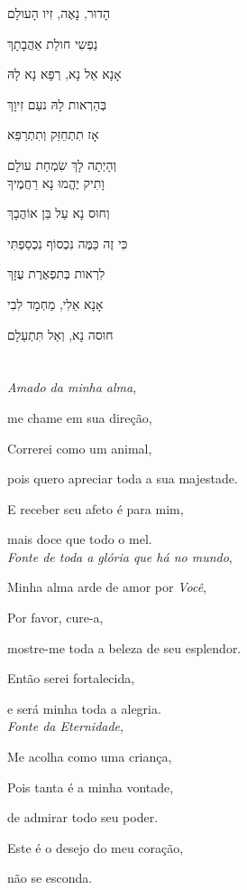הָדוּר, נָאֶה, זִיו הָעולָם

נַפְשִי חולַת אַהֲבָתָךְ

אָנָא אֵל נָא, רְפָא נָא לָהּ

בְּהַרְאות לָהּ נעַם זִיוָךְ

אָז תִתְחֵזֵּק וְתִתְרַפֵּא

וְהָיְתָה לָךְ שִׂמְחַת עולָם\\[10pt]

וָתִיק יֶהֱמוּ נָא רַחֲמֶיךָ

וְחוּס נָא עַל בֵּן אוֹהֲבָךְ

כִּי זֶה כַּמֶּה נִכְסוֹף נִכְסַפְתִּי

לִרְאות בְּתִפְאֶרֶת עֻזָךְ

אָנָא אֵלִי, מַחְמָד לִבִי

חוּסה נָא, וְאַל תִּתְעַלָם


\movetooddpage
\raggedright

\section{}

\emph{Amado da minha alma},

me chame em sua direção,

Correrei como um animal,

pois quero apreciar toda a sua majestade.

E receber seu afeto é para mim,

mais doce que todo o mel.\\[10pt]

\emph{Fonte de toda a glória que há no mundo},

Minha alma arde de amor por \emph{Você},

Por favor, cure-a,

mostre-me toda a beleza de seu esplendor.

Então serei fortalecida,

e será minha toda a alegria.\\[10pt]

\emph{Fonte da Eternidade},

Me acolha como uma criança,

Pois tanta é a minha vontade,

de admirar todo seu poder.

Este é o desejo do meu coração,

não se esconda.


\movetoevenpage
\raggedleft


